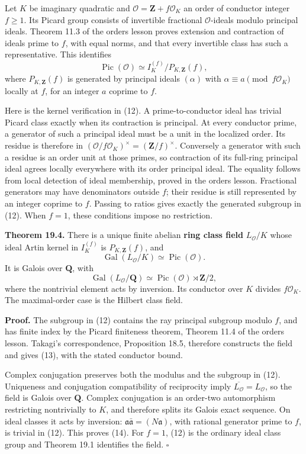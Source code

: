 \documentclass[11pt,a4paper]{article}
\begin{document}
Let \(K\) be imaginary quadratic and
\(\mathcal O=\mathbf Z+f\mathcal O_K\) an order of conductor integer
\(f\geq1\). Its Picard group consists of invertible fractional
\(\mathcal O\)-ideals modulo principal ideals. Theorem 11.3 of the
orders lesson proves extension and contraction of ideals prime to \(f\),
with equal norms, and that every invertible class has such a
representative. This identifies \[
\operatorname{Pic}(\mathcal O)\simeq I_K^{(f)}/P_{K,\mathbf Z}(f),
\tag{12}
\] where \(P_{K,\mathbf Z}(f)\) is generated by principal ideals
\((\alpha)\) with \(\alpha\equiv a\pmod{f\mathcal O_K}\) locally at
\(f\), for an integer \(a\) coprime to \(f\).

Here is the kernel verification in (12). A prime-to-conductor ideal has
trivial Picard class exactly when its contraction is principal. At every
conductor prime, a generator of such a principal ideal must be a unit in
the localized order. Its residue is therefore in
\((\mathcal O/f\mathcal O_K)^\times=(\mathbf Z/f)^\times\). Conversely a
generator with such a residue is an order unit at those primes, so
contraction of its full-ring principal ideal agrees locally everywhere
with its order principal ideal. The equality follows from local
detection of ideal membership, proved in the orders lesson. Fractional
generators may have denominators outside \(f\); their residue is still
represented by an integer coprime to \(f\). Passing to ratios gives
exactly the generated subgroup in (12). When \(f=1\), these conditions
impose no restriction.

\textbf{Theorem 19.4.} There is a unique finite abelian \textbf{ring
class field} \(L_{\mathcal O}/K\) whose ideal Artin kernel in
\(I_K^{(f)}\) is \(P_{K,\mathbf Z}(f)\), and \[
\operatorname{Gal}(L_{\mathcal O}/K)\simeq\operatorname{Pic}(\mathcal O).
\tag{13}
\] It is Galois over \(\mathbf Q\), with \[
\operatorname{Gal}(L_{\mathcal O}/\mathbf Q)
\simeq\operatorname{Pic}(\mathcal O)\rtimes\mathbf Z/2,
\tag{14}
\] where the nontrivial element acts by inversion. Its conductor over
\(K\) divides \(f\mathcal O_K\). The maximal-order case is the Hilbert
class field.

\textbf{Proof.} The subgroup in (12) contains the ray principal subgroup
modulo \(f\), and has finite index by the Picard finiteness theorem,
Theorem 11.4 of the orders lesson. Takagi's correspondence, Proposition
18.5, therefore constructs the field and gives (13), with the stated
conductor bound.

Complex conjugation preserves both the modulus and the subgroup in (12).
Uniqueness and conjugation compatibility of reciprocity imply
\(\overline{L_{\mathcal O}}=L_{\mathcal O}\), so the field is Galois
over \(\mathbf Q\). Complex conjugation is an order-two automorphism
restricting nontrivially to \(K\), and therefore splits its Galois exact
sequence. On ideal classes it acts by inversion:
\(\mathfrak a\bar{\mathfrak a}=(N\mathfrak a)\), with rational generator
prime to \(f\), is trivial in (12). This proves (14). For \(f=1\), (12)
is the ordinary ideal class group and Theorem 19.1 identifies the field.
\(\square\)
\end{document}
